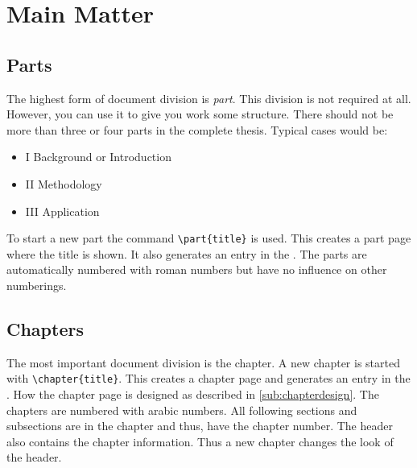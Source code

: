 
\chapter{Main Matter}%
\label{Chapter3}

\section{Parts}%
\label{cmd:part}

The highest form of document division is \emph{part}. This division is not
required at all. However, you can use it to give you work some structure.
There should not be more than three or four parts in the complete thesis.
Typical cases would be:
\begin{itemize}
    \item I Background or Introduction
    \item II Methodology
    \item III Application
\end{itemize}
To start a new part the command \verb!\part{title}! is used. This creates a
part page where the title is shown. It also generates an entry in the
.  The parts are automatically numbered with roman numbers but have
no influence on other numberings.

\section{Chapters}%
\label{sec:chapter}

The most important document division is the chapter. A new chapter is started
with \verb!\chapter{title}!. This creates a chapter page and generates an
entry in the . How the chapter page is designed as described in
\autoref{sub:chapterdesign}. The chapters are numbered with arabic numbers.
All following sections and subsections are in the chapter and thus, have the
chapter number.  The header also contains the chapter information. Thus a new
chapter changes the look of the header.

